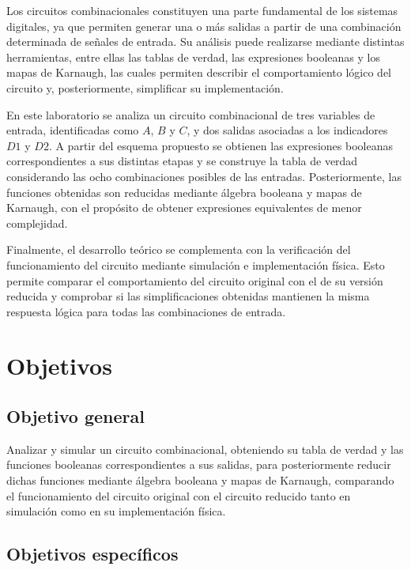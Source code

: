 \documentclass[12pt]{report}
\begin{document}
Los circuitos combinacionales constituyen una parte fundamental de los sistemas digitales, ya que permiten generar una o más salidas a partir de una combinación determinada de señales de entrada. Su análisis puede realizarse mediante distintas herramientas, entre ellas las tablas de verdad, las expresiones booleanas y los mapas de Karnaugh, las cuales permiten describir el comportamiento lógico del circuito y, posteriormente, simplificar su implementación.

En este laboratorio se analiza un circuito combinacional de tres variables de entrada, identificadas como $A$, $B$ y $C$, y dos salidas asociadas a los indicadores $D1$ y $D2$. A partir del esquema propuesto se obtienen las expresiones booleanas correspondientes a sus distintas etapas y se construye la tabla de verdad considerando las ocho combinaciones posibles de las entradas. Posteriormente, las funciones obtenidas son reducidas mediante álgebra booleana y mapas de Karnaugh, con el propósito de obtener expresiones equivalentes de menor complejidad.

Finalmente, el desarrollo teórico se complementa con la verificación del funcionamiento del circuito mediante simulación e implementación física. Esto permite comparar el comportamiento del circuito original con el de su versión reducida y comprobar si las simplificaciones obtenidas mantienen la misma respuesta lógica para todas las combinaciones de entrada.


\section{Objetivos}

\subsection{Objetivo general}

Analizar y simular un circuito combinacional, obteniendo su tabla de verdad y las funciones booleanas correspondientes a sus salidas, para posteriormente reducir dichas funciones mediante álgebra booleana y mapas de Karnaugh, comparando el funcionamiento del circuito original con el circuito reducido tanto en simulación como en su implementación física.

\subsection{Objetivos específicos}
\end{document}
